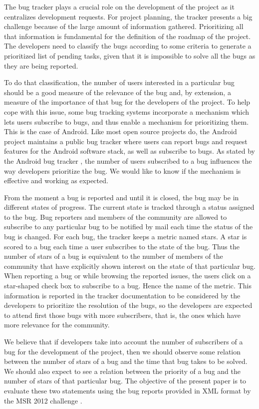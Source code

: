 \documentclass[10pt, conference, compsocconf]{IEEEtran}
\begin{document}
The bug tracker plays a crucial role on the development of the project as it centralizes development requests. For project planning, the tracker presents a big challenge because of the large amount of information gathered. Prioritizing all that information is fundamental for the definition of the roadmap of the project. The developers need to classify the bugs according to some criteria to generate a prioritized list of pending tasks, given that it is impossible to solve all the bugs as they are being reported.

To do that classification, the number of users interested in a particular bug should be a good measure of the relevance of the bug and, by extension, a measure of the importance of that bug for the developers of the project. To help cope with this issue, some bug tracking systems incorporate a mechanism which lets users subscribe to bugs, and thus enable a mechanism for prioritizing them. This is the case of Android. Like most open source projects do, the Android project maintains a public bug tracker where users can report bugs and request features for the Android software stack, as well as subscribe to bugs. As stated by the Android bug tracker \cite{ReportBugs}, the number of users subscribed to a bug influences the way developers prioritize the bug. We would like to know if the mechanism is effective and working as expected.

From the moment a bug is reported and until it is closed, the bug may be in different states of progress. The current state is tracked through a status assigned to the bug. Bug reporters and members of the community are allowed to subscribe to any particular bug to be notified by mail each time the status of the bug is changed.  For each bug, the tracker keeps a metric named stars. A star is scored to a bug each time a user subscribes to the state of the bug. Thus the number of stars of a bug is equivalent to the number of members of the community that have explicitly shown interest on the state of that particular bug. When reporting a bug or  while browsing the reported issues, the users click on a star-shaped check box to subscribe to a bug. Hence the name of the metric. This information is reported in the tracker documentation to be considered by the developers to prioritize the resolution of the bugs, so the developers are expected to attend first those bugs with more subscribers, that is, the ones which have more relevance for the community.

We believe that if developers take into account the number of subscribers of a bug for the development of the project, then we should observe some relation between the number of stars of a bug and the time that bug takes to be solved. We should also expect to see a relation between the priority of a bug and the number of stars of that particular bug. The objective of the present paper is to evaluate these two statements using the bug reports provided in XML format by the MSR 2012 challenge \cite{MSR}. 
\end{document}
